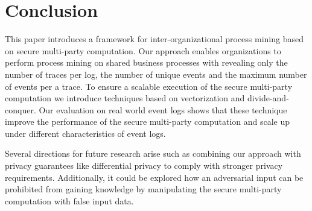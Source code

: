 \documentclass[runningheads]{llncs}
\begin{document}
\section{Conclusion}
\label{sec:conclusion}
This paper introduces a framework for inter-organizational process mining based on secure multi-party computation. Our approach enables organizations to perform process mining on shared business processes with revealing only the number of traces per log, the number of unique events and the maximum number of events per a trace. To ensure a scalable execution of the secure multi-party computation we introduce techniques based on vectorization and divide-and-conquer. Our evaluation on real world event logs shows that these technique improve the performance of the secure multi-party computation and scale up under different characteristics of event logs.

Several directions for future research arise such as combining our approach with privacy guarantees like differential privacy to comply with stronger privacy requirements. Additionally, it could be explored how an adversarial input can be prohibited from gaining knowledge by manipulating the secure multi-party computation with false input data.

 
 
\end{document}
